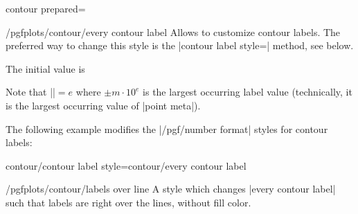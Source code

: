 {{\begin{plottype}[/pgfplots]{contour prepared=\textcolor{black}{}}
    \begin{stylekey}{/pgfplots/contour/every contour label}
        Allows to customize contour labels. The preferred way to change this
        style is the |contour label style=| method, see below.

        The initial value is
\begin{codeexample}
\end{codeexample}
    \noindent Note that |\pgfplotspointmetarangeexponent|$=e$ where $\pm m
    \cdot 10^e$ is the largest occurring label value (technically, it is the
    largest occurring value of |point meta|).

    The following example modifies the |/pgf/number format| styles for contour
    labels:
\begin{codeexample}[]
\end{codeexample}
    \end{stylekey}

\pgfplotsshortstylekey contour/contour label style=contour/every contour label\pgfeov
    \begin{stylekey}{/pgfplots/contour/labels over line}
        A style which changes |every contour label| such that labels are right
        over the lines, without fill color.

\begin{codeexample}[]
\end{codeexample}
    \end{stylekey}


\end{plottype}}}
